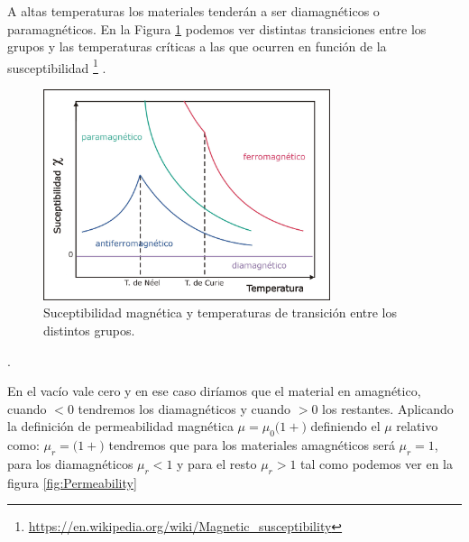 A altas temperaturas los materiales tenderán a ser diamagnéticos o paramagnéticos.
En la Figura \ref{fig:suceptibilidades} podemos ver distintas transiciones entre los grupos y las temperaturas críticas a las que ocurren en función de la susceptibilidad \footnote{\url{https://en.wikipedia.org/wiki/Magnetic\_susceptibility}} \raisebox{\depth}{\scalebox{1.25}{$\chi$}}. 


\begin{figure}[h]
	\centering
	\includegraphics[width=0.75\textwidth]{./Figures/suceptibilidades}
	\caption{Suceptibilidad magnética y temperaturas de transición entre los distintos grupos.}
	\label{fig:suceptibilidades}
\end{figure}.



En el vacío \raisebox{\depth}{\scalebox{1.25}{$\chi$}} vale cero y en ese caso diríamos que el material en amagnético, cuando \raisebox{\depth}{\scalebox{1.25}{$\chi$}}$<0$ tendremos los diamagnéticos y cuando \raisebox{\depth}{\scalebox{1.25}{$\chi$}}$>0$ los restantes. Aplicando la definición de permeabilidad magnética $\mu = \mu_{0}(1+$\raisebox{\depth}{\scalebox{1.25}{$\chi$}}$)$ definiendo el $\mu$ relativo como: $\mu_{r}=(1+$\raisebox{\depth}{\scalebox{1.25}{$\chi$}}$)$ tendremos que para los materiales amagnéticos será $\mu_{r}=1$, para los diamagnéticos $\mu_{r}<1$ y para el resto $\mu_{r}>1$ tal como podemos ver en la figura \ref{fig:Permeability}



